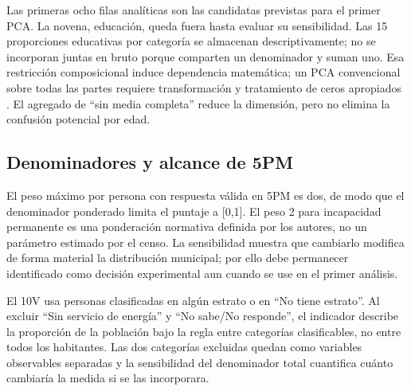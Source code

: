 Las primeras ocho filas analíticas son las candidatas previstas para el primer PCA. La novena, educación, queda fuera hasta evaluar su sensibilidad. Las 15 proporciones educativas por categoría se almacenan descriptivamente; no se incorporan juntas en bruto porque comparten un denominador y suman uno. Esa restricción composicional induce dependencia matemática; un PCA convencional sobre todas las partes requiere transformación y tratamiento de ceros apropiados \citep{aitchison1983compositional}. El agregado de \enquote{sin media completa} reduce la dimensión, pero no elimina la confusión potencial por edad.

\subsection{Denominadores y alcance de 5PM}

El peso máximo por persona con respuesta válida en 5PM es dos, de modo que el denominador ponderado limita el puntaje a [0,1]. El peso 2 para incapacidad permanente es una ponderación normativa definida por los autores, no un parámetro estimado por el censo. La sensibilidad muestra que cambiarlo modifica de forma material la distribución municipal; por ello debe permanecer identificado como decisión experimental aun cuando se use en el primer análisis.

El 10V usa personas clasificadas en algún estrato o en \enquote{No tiene estrato}. Al excluir \enquote{Sin servicio de energía} y \enquote{No sabe/No responde}, el indicador describe la proporción de la población bajo la regla entre categorías clasificables, no entre todos los habitantes. Las dos categorías excluidas quedan como variables observables separadas y la sensibilidad del denominador total cuantifica cuánto cambiaría la medida si se las incorporara.
